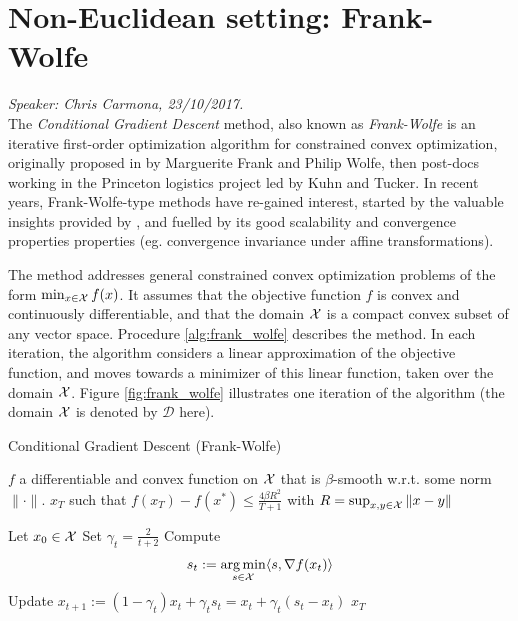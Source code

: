 
\chapter{Non-Euclidean setting: Frank-Wolfe}
\emph{Speaker: Chris Carmona, 23/10/2017.}\\

The \emph{Conditional Gradient Descent} method, also known as \emph{Frank-Wolfe} is an iterative first-order optimization algorithm for constrained convex optimization, originally proposed in \cite{Frank1956} by Marguerite Frank and Philip Wolfe, then post-docs working in the Princeton logistics project led by Kuhn and Tucker. In recent years, Frank-Wolfe-type methods have re-gained interest, started by the valuable insights provided by \cite{Jaggi2013}, and fuelled by its good scalability and convergence properties properties (eg. convergence invariance under affine transformations).

The method addresses general constrained convex optimization problems of the form $\min_{x \in \mathcal{X}} f(x)$. It assumes that the objective function $f$ is convex and continuously differentiable, and that the domain $\mathcal{X}$ is a compact convex subset of any vector space. Procedure \ref{alg:frank_wolfe} describes the method. In each iteration, the algorithm considers a linear approximation of the objective function, and moves towards a minimizer of this linear function, taken over the domain $\mathcal{X}$. Figure \ref{fig:frank_wolfe} illustrates one iteration of the algorithm (the domain $\mathcal{X}$ is denoted by $\mathcal{D}$ here).

\begin{algorithm}
\caption{Conditional Gradient Descent (Frank-Wolfe)}
   \begin{algorithmic}[1] \label{alg:frank_wolfe}
   \REQUIRE $f$ a differentiable and convex function on $\mathcal{X}$ that is $\beta$-smooth w.r.t. some norm $\|\cdot\|$.
   \ENSURE $x_T$ such that $f(x_T)-f(x^\ast) \leq \frac{4 \beta R^2 }{T+1}$ with $R = \sup_{x,y \in \mathcal{X}} \| x - y\|$
   
   \STATE Let $x_{0} \in \mathcal{X}$
      \STATE Set $\gamma_t=\frac{2}{t+2}$
      \STATE Compute
      \begin{equation} \label{eq:fw_update}
      s_t:= \operatorname*{arg\,min}_{s \in \mathcal{X} } \langle s, \nabla f(x_t) \rangle
      \end{equation}
      \STATE Update $x_{t+1} := (1-\gamma_t)x_t+ \gamma_t s_t = x_{t} + \gamma_t (s_t-x_t)$
   \ENDFOR
    $x_T$
\end{algorithmic}
\end{algorithm}

